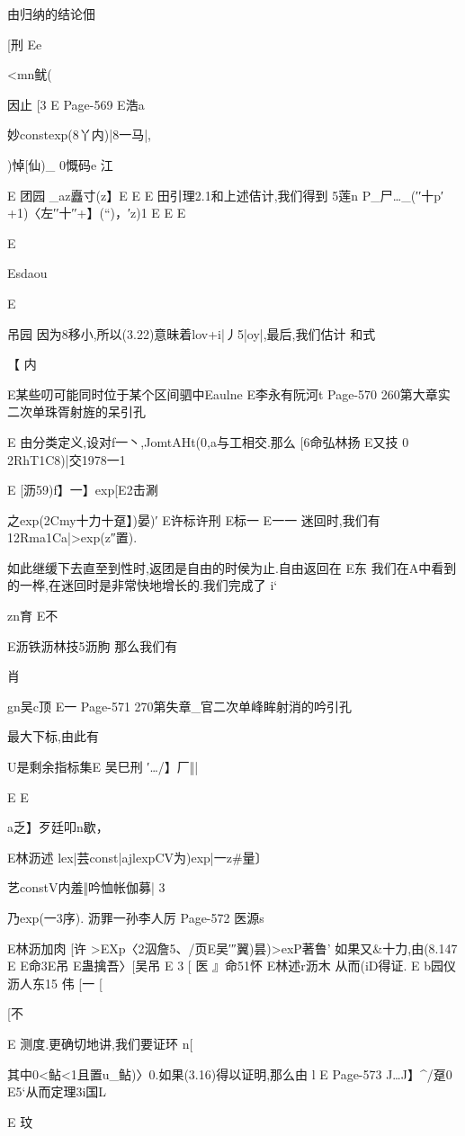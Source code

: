 {{由归纳的结论佃%

[刑
Ee

<mn鱿(

因止
[3
E
Page-569
E浩a

妙constexp(8丫内)|8一马|,

)悼[仙)_
0慨码e
江

E
团园
_az矗寸(z】E
E
E
田引理2.1和上述佶计,我们得到
5莲n
P_尸…_(′′十p′+1)〈左′′十′′+】(“)，′z)1
E
E
E

E

Esdaou

E

吊园
因为8移小,所以(3.22)意昧着lov+i|丿5|oy|,最后,我们估计
和式

【
内

E某些叨可能同时位于某个区间驷中Eaulne
E李永有阮河t
Page-570
260第大章实二次单珠胥射旌的呆引孔

E
由分类定义,设对f一丶,JomtAHt(0,a与工相交.那么
[6命弘林扬
E又技
0
2RhT1C8)|交1978一1

E
[沥59)f】一】exp[E2击涮

之exp(2Cmy十力十趸】)晏)′
E许标许刑
E标一
E一一
迷回时,我们有
12Rma1Ca|>exp(z″置).

如此继缓下去直至到性时,返团是自由的时侯为止.自由返回在
E东
我们在A中看到的一桦,在迷回时是非常快地增长的.我们完成了
i`

zn育
E不

E沥铁沥林技5沥朐
那么我们有

肖

gn吴c顶
E一
Page-571
270第失章_官二次单峰眸射消的吟引孔

最大下标,由此有

U是剩余指标集E
吴巳刑
′…/】厂‖|

E
E

a乏】歹廷叩n歇，

E林沥述
lex|芸const|ajlexpCV为)exp|一z#量〕

艺constV内羞‖吟恤帐伽募|
3

乃exp(一3序).
沥罪一孙李人厉
Page-572
医源s

E林沥加肉
[许
>EXp〈2泅詹5、/页E吴′″翼)昙)>exP著鲁'
如果又&十力,由(8.147
E
E命3E吊
E蛊擒吾〉[吴吊
E
3
[
医
』命51怀
E林述r沥木
从而(iD得证.
E
b园仪沥人东15
伟
[一
[

[不

E
测度.更确切地讲,我们要证环
n[

其中0<鲇<1且置u_鲇)〉0.如果(3.16)得以证明,那么由
l
E
Page-573
J…J】^/趸0
E5`从而定理3i国L

E
玟

}}
